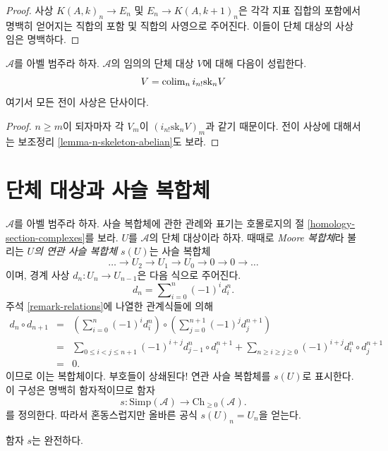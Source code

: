 \begin{proof}
사상 $K(A, k)_n \to E_n$ 및 $E_n \to K(A, k + 1)_n$은 각각 지표 집합의
포함에서 명백히 얻어지는 직합의 포함 및 직합의 사영으로 주어진다.
이들이 단체 대상의 사상임은 명백하다.
\end{proof}

\begin{lemma}
\label{lemma-abelian-limit-skeleta}
$\mathcal{A}$를 아벨 범주라 하자. $\mathcal{A}$의 임의의 단체 대상
$V$에 대해 다음이 성립한다.
$$
V = \mathop{\mathrm{colim}}\nolimits_n i_{n!}\text{sk}_n V
$$
여기서 모든 전이 사상은 단사이다.
\end{lemma}

\begin{proof}
$n \geq m$이 되자마자 각 $V_m$이 $(i_{n!}\text{sk}_n V)_m$과 같기
때문이다. 전이 사상에 대해서는 보조정리
\ref{lemma-n-skeleton-abelian}도 보라.
\end{proof}

\section{단체 대상과 사슬 복합체}
\label{section-complexes}

\noindent
$\mathcal{A}$를 아벨 범주라 하자. 사슬 복합체에 관한 관례와 표기는
호몰로지의 절 \ref{homology-section-complexes}를 보라.
$U$를 $\mathcal{A}$의 단체 대상이라 하자. 때때로 {\it Moore 복합체}라
불리는 {\it $U$의 연관 사슬 복합체 $s(U)$}는 사슬 복합체
$$
\ldots \to U_2 \to U_1 \to U_0 \to 0 \to 0 \to \ldots
$$
이며, 경계 사상 $d_n : U_n \to U_{n - 1}$은 다음 식으로 주어진다.
$$
d_n = \sum\nolimits_{i = 0}^n (-1)^i d^n_i.
$$
주석 \ref{remark-relations}에 나열한 관계식들에 의해
\begin{eqnarray*}
d_n \circ d_{n + 1}
& = &
(\sum\nolimits_{i = 0}^n (-1)^i d^n_i) \circ
(\sum\nolimits_{j = 0}^{n + 1} (-1)^j d^{n + 1}_j) \\
& = &
\sum\nolimits_{0 \leq i < j \leq n + 1}
(-1)^{i + j} d^n_{j - 1} \circ d^{n + 1}_i
+
\sum\nolimits_{n \geq i \geq j \geq 0}
(-1)^{i + j} d^n_i \circ d^{n + 1}_j \\
& = & 0.
\end{eqnarray*}
이므로 이는 복합체이다. 부호들이 상쇄된다! 연관 사슬 복합체를
$s(U)$로 표시한다. 이 구성은 명백히 함자적이므로 함자
$$
s : \text{Simp}(\mathcal{A}) \longrightarrow \text{Ch}_{\geq 0}(\mathcal{A}).
$$
를 정의한다. 따라서 혼동스럽지만 올바른 공식 $s(U)_n = U_n$을 얻는다.

\begin{lemma}
\label{lemma-s-exact}
함자 $s$는 완전하다.
\end{lemma}

